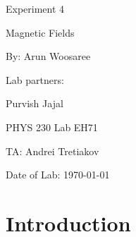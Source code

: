 \documentclass[letterpaper]{article}
\begin{document}
  \begin{titlepage}
    \begin{center}
        \vspace*{1cm}
        \Huge
        Experiment 4
        \vspace{1cm}

        Magnetic Fields
        \vspace{1cm}

        By: Arun Woosaree
        \vspace{1cm}

        Lab partners:
        \vspace{.25cm}
        \Large

        Purvish Jajal
        \vspace{.25cm}

        \Huge
        PHYS 230 Lab EH71
        \vspace{1cm}

        TA: Andrei Tretiakov
        \vspace{1cm}

        Date of Lab: \today
        \vfill
    \end{center}
\end{titlepage}

\section{Introduction}
\end{document}
